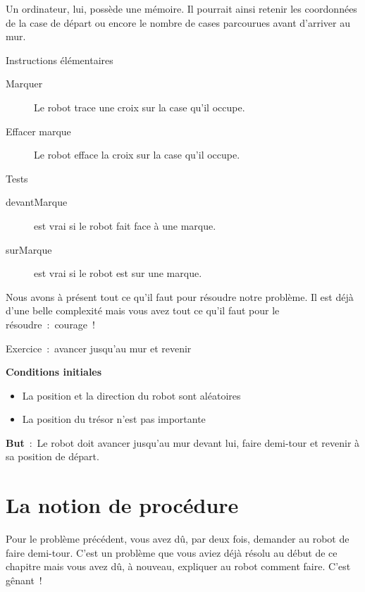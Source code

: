 	Un ordinateur, lui, possède une mémoire. Il pourrait ainsi retenir les
	coordonnées de la case de départ ou encore le nombre de cases
	parcourues avant d’arriver au mur.

	
	\begin{Emphase}[definition]{Instructions élémentaires}
		\remonter
		\begin{description}
		\item[Marquer]
			Le robot trace une croix sur la case qu’il occupe.
		\item[Effacer marque]
			Le robot efface la croix sur la case qu’il occupe.
		\end{description}
	\end{Emphase}

	\begin{Emphase}{Tests}
		\remonter
		\begin{description}
		\item[devantMarque]
			est vrai si le robot fait face à une marque.
		\item[surMarque]
			est vrai si le robot est sur une marque.
		\end{description}
	\end{Emphase}

	Nous avons à présent tout ce qu’il faut pour résoudre
	notre problème. Il est déjà d’une belle complexité
	mais vous avez tout ce qu’il faut pour le résoudre~:~courage~!

	
	\begin{Emphase}[exercice]{Exercice~:~avancer jusqu’au mur et revenir}

		\textbf{Conditions initiales}

		\begin{itemize}
		\item La position et la direction du robot sont aléatoires
		\item La position du trésor n’est pas importante
		\end{itemize}
		
		\textbf{But}~:~Le robot doit avancer jusqu’au mur
		devant lui, faire demi-tour et revenir à sa position de départ.

	\end{Emphase}

\section{La notion de procédure}

	Pour le problème précédent, vous avez dû, par deux fois, demander au
	robot de faire demi-tour. C’est un problème que vous
	aviez déjà résolu au début de ce chapitre mais vous avez dû, à nouveau,
	expliquer au robot comment faire. C’est gênant~!

